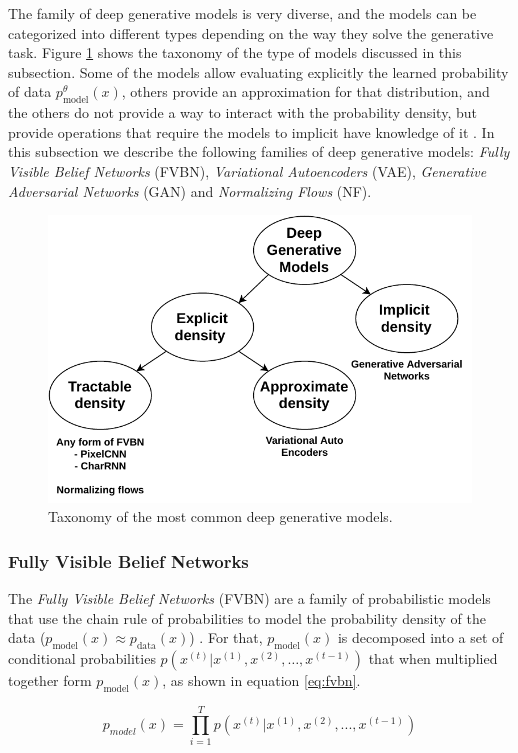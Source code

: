 The family of deep generative models is very diverse, and the models can be categorized into different types depending on the way they solve the generative task. Figure \ref{fig:generativetaxonomy} shows the taxonomy of the type of models discussed in this subsection. Some of the models allow evaluating explicitly the learned probability of data $p^\theta_\mathrm{model}(x)$, others provide an approximation for that distribution, and the others do not provide a way to interact with the probability density, but provide operations that require the models to implicit have knowledge of it \autocite{Goodfellow2016}. In this subsection we describe the following families of deep generative models: \textit{Fully Visible Belief Networks} (FVBN), \textit{Variational Autoencoders} (VAE), \textit{Generative Adversarial Networks} (GAN) and \textit{Normalizing Flows} (NF).

\begin{figure}
	\centering
	\includegraphics[width=0.7\linewidth]{chapter2/images/generativetaxonomy}
	\caption{Taxonomy of the most common deep generative models.}
	\label{fig:generativetaxonomy}
\end{figure}


\subsubsection{Fully Visible Belief Networks}
The \textit{Fully Visible Belief Networks} (FVBN) are a family of probabilistic models that use the chain rule of probabilities to model the probability density of the data ($p_\mathrm{model}(x) \approx p_\mathrm{data}(x)$) \autocite{smith2018}. For that, $p_\mathrm{model}(x)$ is decomposed into a set of conditional probabilities $p(x^{(t)}| x^{(1)}, x^{(2)}, \ldots, x^{(t-1)})$ that when multiplied together form  $p_\mathrm{model}(x)$, as shown in equation \ref{eq:fvbn}.

\begin{equation}
	\label{eq:fvbn}
	p_{model}(x) = \prod_{i=1}^{T} p(x^{(t)}| x^{(1)}, x^{(2)}, ..., x^{(t-1)})
\end{equation}

